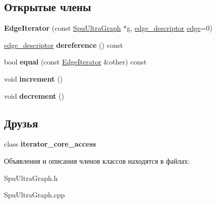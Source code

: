 \subsection*{Открытые члены}
\begin{DoxyCompactItemize}
\item 
\mbox{\label{class_s_p_u___g_r_a_p_h_1_1_spu_ultra_graph_1_1_edge_iterator_af258057cf189f894ba94bd0eb204ccf8}} 
{\bfseries Edge\+Iterator} (const \hyperlink{class_s_p_u___g_r_a_p_h_1_1_spu_ultra_graph}{Spu\+Ultra\+Graph} $\ast$g, \hyperlink{class_s_p_u___g_r_a_p_h_1_1_spu_ultra_graph_a5f3776e003ef0a1648f1d9f84289810b}{edge\+\_\+descriptor} \hyperlink{class_s_p_u___g_r_a_p_h_1_1_spu_ultra_graph_a51468aa2278d3abb0c338ffbeac7747a}{edge}=0)
\item 
\mbox{\label{class_s_p_u___g_r_a_p_h_1_1_spu_ultra_graph_1_1_edge_iterator_a16b8fa40556388fcd34f1fc60875fcb7}} 
\hyperlink{class_s_p_u___g_r_a_p_h_1_1_spu_ultra_graph_a5f3776e003ef0a1648f1d9f84289810b}{edge\+\_\+descriptor} {\bfseries dereference} () const
\item 
\mbox{\label{class_s_p_u___g_r_a_p_h_1_1_spu_ultra_graph_1_1_edge_iterator_aafe02491fd261530f0401712d10d42c2}} 
bool {\bfseries equal} (const \hyperlink{class_s_p_u___g_r_a_p_h_1_1_spu_ultra_graph_1_1_edge_iterator}{Edge\+Iterator} \&other) const
\item 
\mbox{\label{class_s_p_u___g_r_a_p_h_1_1_spu_ultra_graph_1_1_edge_iterator_a6f6a205cfb0546d7a4063ae78a00ffaf}} 
void {\bfseries increment} ()
\item 
\mbox{\label{class_s_p_u___g_r_a_p_h_1_1_spu_ultra_graph_1_1_edge_iterator_aabc6a676b6aa95ad845bf6bba49e2517}} 
void {\bfseries decrement} ()
\end{DoxyCompactItemize}
\subsection*{Друзья}
\begin{DoxyCompactItemize}
\item 
\mbox{\label{class_s_p_u___g_r_a_p_h_1_1_spu_ultra_graph_1_1_edge_iterator_a0975271623c74c5b89bdf8d7fbce69c4}} 
class {\bfseries iterator\+\_\+core\+\_\+access}
\end{DoxyCompactItemize}


Объявления и описания членов классов находятся в файлах\+:\begin{DoxyCompactItemize}
\item 
Spu\+Ultra\+Graph.\+h\item 
Spu\+Ultra\+Graph.\+cpp\end{DoxyCompactItemize}
